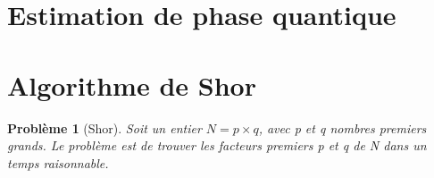 \documentclass[12pt,a4paper]{article}
\newtheorem{pb}{Problème}
\begin{document}
\section{Estimation de phase quantique}
\section{Algorithme de Shor}
\begin{pb}[Shor]
Soit un entier $N = p \times q$, avec p et q nombres premiers grands. Le problème est de trouver les facteurs premiers p et q de N dans un temps raisonnable.
\end{pb}

\begin{algorithm}[H]
  \SetAlgoLined
\end{algorithm}
\end{document}
